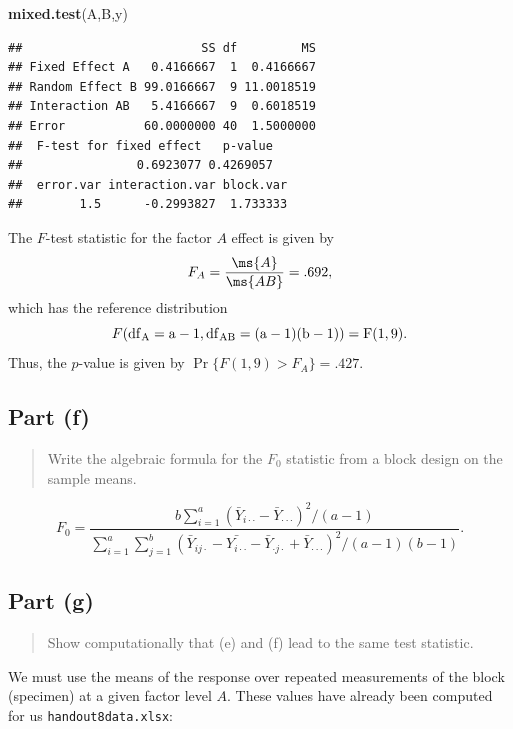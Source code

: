 \documentclass[
]{article}
\newenvironment{Shaded}{\begin{snugshade}}{\end{snugshade}}
\newcommand{\FunctionTok}[1]{\textcolor[rgb]{0.13,0.29,0.53}{\textbf{#1}}}
\newcommand{\NormalTok}[1]{#1}
\begin{document}
\begin{Shaded}
\begin{Highlighting}[]
\FunctionTok{mixed.test}\NormalTok{(A,B,y)}
\end{Highlighting}
\end{Shaded}

\begin{verbatim}
##                         SS df         MS
## Fixed Effect A   0.4166667  1  0.4166667
## Random Effect B 99.0166667  9 11.0018519
## Interaction AB   5.4166667  9  0.6018519
## Error           60.0000000 40  1.5000000
##  F-test for fixed effect   p-value
##                0.6923077 0.4269057
##  error.var interaction.var block.var
##        1.5      -0.2993827  1.733333
\end{verbatim}

The \(F\)-test statistic for the factor \(A\) effect is given by \[
  F_A = \frac{\ms{A}}{\ms{A B}} = .692,
\] which has the reference distribution \[
  F(\rm{df}_A=a-1,\rm{df}_{A B} = (a-1)(b-1)) = F(1,9).
\] Thus, the \(p\)-value is given by \(\Pr\{F(1,9) > F_A\} = .427\).

\hypertarget{part-f}{%
\subsection{Part (f)}\label{part-f}}

\begin{quote}
Write the algebraic formula for the \(F_0\) statistic from a block
design on the sample means.
\end{quote}

\[
  F_0 = \frac
    {b \sum_{i=1}^{a}(\bar{Y}_{i\cdot\cdot} - \bar{Y}_{\cdot\cdot\cdot})^2/(a-1)}
    {\sum_{i=1}^{a}\sum_{j=1}^{b}(
      \bar{Y}_{i j\cdot}-
      \bar{Y_{i \cdot\cdot}}-
      \bar{Y}_{\cdot j \cdot}+
      \bar{Y}_{\cdot\cdot\cdot}
      )^2 / (a-1)(b-1)}.
\]

\hypertarget{part-g}{%
\subsection{Part (g)}\label{part-g}}

\begin{quote}
Show computationally that (e) and (f) lead to the same test statistic.
\end{quote}

We must use the means of the response over repeated measurements of the
block (specimen) at a given factor level \(A\). These values have
already been computed for us \texttt{handout8data.xlsx}:
\end{document}
